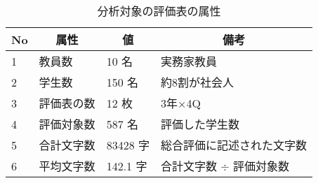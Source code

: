 %
\begin{table}[!tbp]
\caption{分析対象の評価表の属性\label{tab:属性表}} 
\begin{center}
\begin{tabular}{llll}
\toprule
\multicolumn{1}{l}{No}&\multicolumn{1}{c}{属性}&\multicolumn{1}{c}{値}&\multicolumn{1}{c}{備考}\tabularnewline
\midrule
1&教員数&10 名&実務家教員\tabularnewline
2&学生数&150 名&約8割が社会人\tabularnewline
3&評価表の数&12 枚&3年×4Q\tabularnewline
4&評価対象数&587 名&評価した学生数\tabularnewline
5&合計文字数&83428 字&総合評価に記述された文字数\tabularnewline
6&平均文字数&142.1 字&合計文字数 $\div$ 評価対象数\tabularnewline
\bottomrule
\end{tabular}
\end{center}
\end{table}

